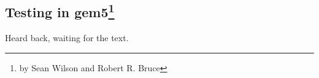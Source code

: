 \subsection[Testing in gem5]{Testing in gem5\footnote{by Sean Wilson and Robert R. Bruce}}

Heard back, waiting for the text.
